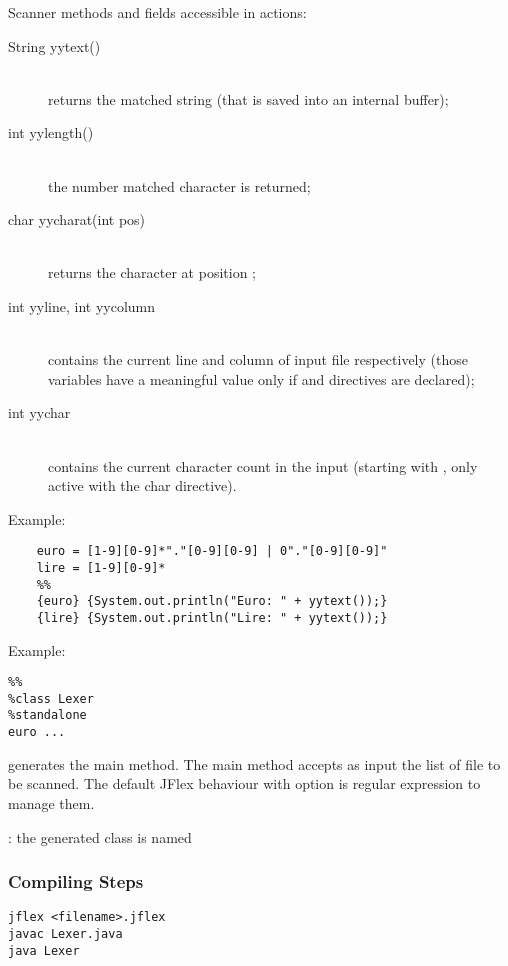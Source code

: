 Scanner methods and fields accessible in actions:
\begin{description}
    \item[String yytext()]\mbox{} \\
    returns the matched string (that is saved into an internal buffer);
    \item[int yylength()]\mbox{} \\
    the number matched character is returned;
    \item[char yycharat(int pos)]\mbox{} \\
    returns the character at position ;
    \item[int yyline, int yycolumn]\mbox{} \\
    contains the current line and column of input file respectively (those variables have a meaningful value only if  and  directives are declared);
    \item[int yychar]\mbox{} \\
    contains the current character count in the input (starting with , only active with the \code{\%} char directive).
\end{description}
Example:
\begin{lstlisting}[frame=single]
    %%
    euro = [1-9][0-9]*"."[0-9][0-9] | 0"."[0-9][0-9]"
    lire = [1-9][0-9]*
    %%
    {euro} {System.out.println("Euro: " + yytext());}
    {lire} {System.out.println("Lire: " + yytext());}
\end{lstlisting}
Example:
\begin{lstlisting}
%%
%class Lexer
%standalone
euro ...
\end{lstlisting}
 generates the main method.
The main method accepts as input the list of file to be scanned.
The default JFlex behaviour with  option is regular expression to manage them.

: the generated class is named 

\subsubsection{Compiling Steps}
\begin{lstlisting}
jflex <filename>.jflex
javac Lexer.java
java Lexer
\end{lstlisting}

